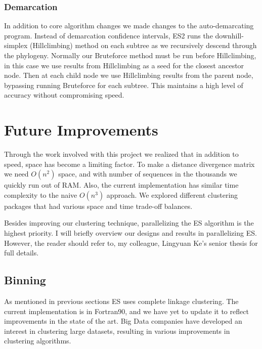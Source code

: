 \subsubsection*{Demarcation}
In addition to core algorithm changes we made changes to the auto-demarcating program.
Instead of demarcation confidence intervals, ES2 runs the downhill-simplex (Hillclimbing) method on each subtree as we recursively descend through the phylogeny.
Normally our Bruteforce method must be run before Hillclimbing, in this case we use results from Hillclimbing as a seed for the closest ancestor node.
Then at each child node we use Hillclimbing results from the parent node, bypassing running Bruteforce for each subtree.
This maintains a high level of accuracy without compromising speed.

\section{Future Improvements}
Through the work involved with this project we realized that in addition to speed, space has become a limiting factor.
To make a distance divergence matrix we need $O(n^2)$ space, and with number of sequences in the thousands we quickly run out of RAM. Also, the current implementation has similar time complexity to the naive $O(n^3)$ approach.
We explored different clustering packages that had various space and time trade-off balances.

Besides improving our clustering technique, parallelizing the ES algorithm is the highest priority.
I will briefly overview our designs and results in parallelizing ES.
However, the reader should refer to, my colleague, Lingyuan Ke's senior thesis for full details.
\subsection*{Binning}
As mentioned in previous sections ES uses complete linkage clustering.
The current implementation is in Fortran90, and we have yet to update it to reflect improvements in the state of the art.
Big Data companies have developed an interest in clustering large datasets, resulting in various improvements in clustering algorithms.
